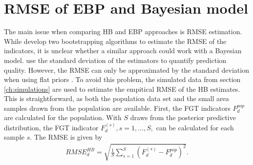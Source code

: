 \section{RMSE of EBP and Bayesian model}
\label{ch:rmse_hb}

The main issue when comparing HB and EBP approaches is RMSE estimation.
While \cite{rojas_perilla_data_2020} develop two bootstrapping algorithms to estimate the RMSE of the indicators, it is unclear whether a similar approach could work with a Bayesian model.
\cite{molina_small_2014} use the standard deviation of the estimators to quantify prediction quality.
However, the RMSE can only be approximated by the standard deviation when using flat priors \citep[Chapter 10.3.2]{rao_small_2015}.
To avoid this problem, the simulated data from section \ref{ch:simulations} are used to estimate the empitical RMSE of the HB estimates.
This is straightforward, as both the population data set and the small area samples drawn from the population are available.
First, the FGT indicators $F_d^{pop}$ are calculated for the population. With $S$ draws from the posterior predictive distribution, the FGT indicator $F_d^{(s)}, s = 1, ..., S,$ can be calculated for each sample $s$.
The RMSE is given by
\begin{gather*}
    RMSE_d^{HB} = \displaystyle \sqrt{\frac 1 S \sum_{s = 1}^S (F_d^{(s)} - F_d^{pop})^2}.
\end{gather*}

